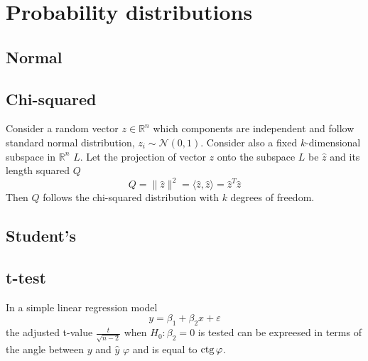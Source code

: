 \section{Probability distributions}

\subsection{Normal}

\subsection{Chi-squared}

Consider a random vector $z \in \mathbb{R}^n$ which components are independent
and follow standard normal distribution, $z_i \sim \mathcal{N}(0,1)$.
Consider also a fixed $k$-dimensional subspace in $\mathbb{R}^n$ $L$.
Let the projection of vector $z$ onto the subspace $L$ be $\hat z$ and
its length squared $Q$
\[
Q = \lVert \hat z \rVert^2 = \langle \hat z, \hat z \rangle = \hat z^T \hat z
\]
Then $Q$ follows the chi-squared distribution with $k$ degrees of freedom.

\subsection{Student's}

\subsection{t-test}

In a simple linear regression model
\[
y = \beta_1 + \beta_2 x + \varepsilon
\]
the adjusted t-value $\frac{t}{\sqrt{n-2}}$ when $H_0: \beta_2 = 0$ is tested
can be expreesed in terms of the angle between $y$ and $\hat y$ $\varphi$ and
is equal to $\operatorname{ctg} \varphi$.

